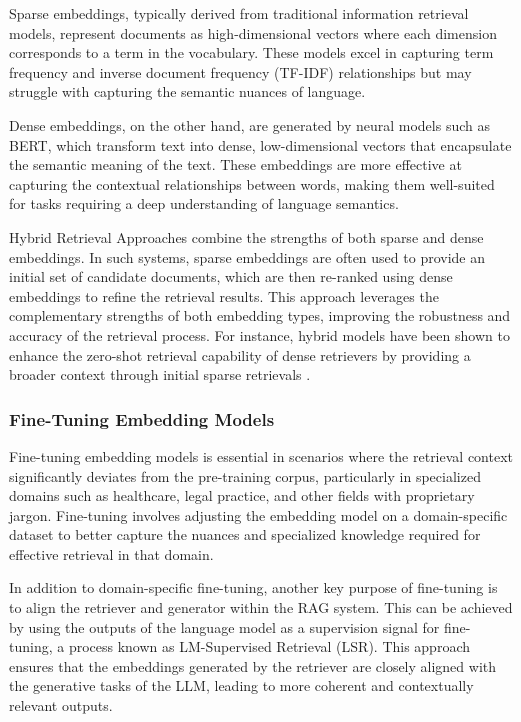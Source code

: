 Sparse embeddings, typically derived from traditional information retrieval models, represent documents as high-dimensional vectors where each dimension corresponds to a term in the vocabulary. These models excel in capturing term frequency and inverse document frequency (TF-IDF) relationships but may struggle with capturing the semantic nuances of language.

Dense embeddings, on the other hand, are generated by neural models such as BERT, which transform text into dense, low-dimensional vectors that encapsulate the semantic meaning of the text. These embeddings are more effective at capturing the contextual relationships between words, making them well-suited for tasks requiring a deep understanding of language semantics.

Hybrid Retrieval Approaches combine the strengths of both sparse and dense embeddings. In such systems, sparse embeddings are often used to provide an initial set of candidate documents, which are then re-ranked using dense embeddings to refine the retrieval results. This approach leverages the complementary strengths of both embedding types, improving the robustness and accuracy of the retrieval process. For instance, hybrid models have been shown to enhance the zero-shot retrieval capability of dense retrievers by providing a broader context through initial sparse retrievals \cite{gao2023retrieval}.

\subsubsection{Fine-Tuning Embedding Models}

Fine-tuning embedding models is essential in scenarios where the retrieval context significantly deviates from the pre-training corpus, particularly in specialized domains such as healthcare, legal practice, and other fields with proprietary jargon. Fine-tuning involves adjusting the embedding model on a domain-specific dataset to better capture the nuances and specialized knowledge required for effective retrieval in that domain.

In addition to domain-specific fine-tuning, another key purpose of fine-tuning is to align the retriever and generator within the RAG system. This can be achieved by using the outputs of the language model as a supervision signal for fine-tuning, a process known as LM-Supervised Retrieval (LSR). This approach ensures that the embeddings generated by the retriever are closely aligned with the generative tasks of the LLM, leading to more coherent and contextually relevant outputs.

